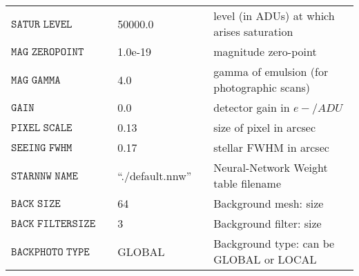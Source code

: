 \documentclass[onecolumn]{aastex61}
\begin{document}
\begin{table}
\begin{center}
\begin{tabular}{@{}lllll}
  $\mathtt{SATUR \; LEVEL}$ & & 50000.0 & &  level (in ADUs) at which arises saturation \\
  $\mathtt{MAG \; ZEROPOINT}$ & & 1.0e-19  & &  magnitude zero-point \\
  $\mathtt{MAG \; GAMMA}$ & & 4.0 & &  gamma of emulsion (for photographic scans) \\
  $\mathtt{GAIN}$ & & 0.0 & &  detector gain in $e-/ADU$ \\
  $\mathtt{PIXEL \; SCALE}$ & & 0.13 & &  size of pixel in arcsec\\
  $\mathtt{SEEING \; FWHM}$ & & 0.17 & &  stellar FWHM in arcsec \\
  $\mathtt{STARNNW \; NAME}$ & & ``./default.nnw'' & &  Neural-Network Weight table filename \\
  $\mathtt{BACK \; SIZE}$ & & 64 & &  Background mesh: size \\
  $\mathtt{BACK \; FILTERSIZE}$ & & 3 & &  Background filter: size \\
  $\mathtt{BACKPHOTO \; TYPE}$ & & GLOBAL & &  Background type: can be GLOBAL or LOCAL \\
 \hline
  \end{tabular}
\end{center}
\end{table}

\end{document}
